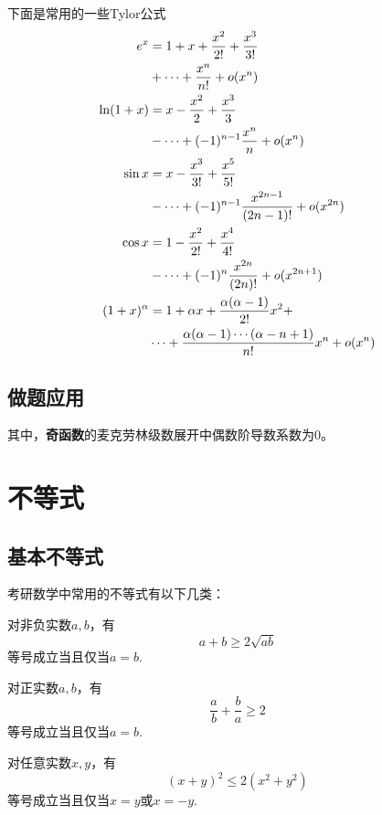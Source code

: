 下面是常用的一些Tylor公式
\begin{align}
	\notag e^x&=1+x+\frac{x^2}{2!}+\frac{x^3}{3!} \\ &+\cdots+\frac{x^n}{n!}+o(x^n)\\
	\notag \ln(1+x)&=x-\frac{x^2}{2}+\frac{x^3}{3}\\ &-\cdots+(-1)^{n-1}\frac{x^n}{n}+o(x^n)\\
	\notag \sin x&=x-\frac{x^3}{3!}+\frac{x^5}{5!}\\ &-\cdots+(-1)^{n-1}\frac{x^{2n-1}}{(2n-1)!}+o(x^{2n})\\
	\notag \cos x&=1-\frac{x^2}{2!}+\frac{x^4}{4!}\\ &-\cdots+(-1)^n\frac{x^{2n}}{(2n)!}+o(x^{2n+1})\\
	\notag (1+x)^\alpha&=1+\alpha x+\frac{\alpha(\alpha-1)}{2!}x^2+ \\  &\cdots+\frac{\alpha(\alpha-1)\cdots(\alpha-n+1)}{n!}x^n+o(x^n)
\end{align}

\subsection{做题应用} \label{tylor-app}

其中，\textbf{奇函数}的麦克劳林级数展开中偶数阶导数系数为0。

\section{不等式} \label{inequlity}

\subsection{基本不等式}

考研数学中常用的不等式有以下几类：

对非负实数$a,b$，有
\begin{equation}
	a+b \geq 2\sqrt {ab}
\end{equation}
等号成立当且仅当$a=b$.

对正实数$a,b$，有
\begin{equation}
	\dfrac{a}{b}+\dfrac{b}{a} \geq 2
\end{equation}
等号成立当且仅当$a=b$.

对任意实数$x,y$，有
\begin{equation}
	(x+y)^2 \leq 2(x^2+y^2)
\end{equation}
等号成立当且仅当$x=y$或$x=-y$.

